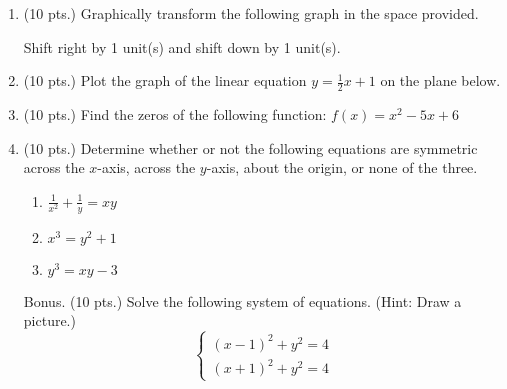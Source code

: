 \documentclass{article}
\begin{document}
\begin{enumerate}
\item (10 pts.) Graphically transform the following graph in the space provided.

\begin{center}
Shift right by 1 unit(s) and shift down by 1 unit(s).
\end{center}

\begin{center}
\MiniGraph[gadget=elliptic4]
\end{center}

   \vspace{1cm}

\newpage

\item (10 pts.) Plot the graph of the linear equation $y = \frac{1}{2} x + 1$ on the plane below.\begin{center}
\CartesianPlane[h=7,w=7,axes=yes]
\end{center}

  

\item (10 pts.) Find the zeros of the following function: $f(x) = x^2 - 5x + 6$ \vspace{3cm}

\item (10 pts.) Determine whether or not the following equations are symmetric across the $x$-axis, across the $y$-axis, about the origin, or none of the three.

\begin{enumerate}
\item $\displaystyle\frac{1}{x^2} + \displaystyle\frac{1}{y} = xy$ \vspace{3cm}
\item $x^3 = y^2 + 1$ \vspace{3cm}
\item $y^3 = xy - 3$ \vspace{3cm}
\end{enumerate}

 \vspace{1cm}

\newpage

\item[Bonus.] (10 pts.) Solve the following system of equations. (Hint: Draw a picture.) \[ \left\{ \begin{array}{l} (x-1)^2 + y^2 = 4 \\ (x+1)^2 + y^2 = 4 \end{array} \right. \]

\end{enumerate}
\end{document}
